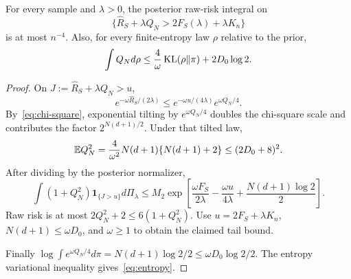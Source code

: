 \begin{lemma}
\label{lem:tail}
For every sample and $\lambda>0$, the posterior raw-risk integral on
\[
 \{\widehat R_S+\lambda Q_N>2F_S(\lambda)+\lambda K_n\}
\]
is at most $n^{-4}$. Also, for every finite-entropy law $\rho$ relative to the prior,
\begin{equation}
 \int Q_Nd\rho\le\frac4\omega\operatorname{KL}(\rho\|\pi)+2D_0\log2.
 \label{eq:entropy}
\end{equation}
\end{lemma}
\begin{proof}
On $J:=\widehat R_S+\lambda Q_N>u$,
\[
 e^{-\omega\widehat R_S/(2\lambda)}
 \le e^{-\omega u/(4\lambda)}e^{\omega Q_N/4}.
\]
By~\eqref{eq:chi-square}, exponential tilting by $e^{\omega Q_N/4}$ doubles the chi-square scale and contributes the factor $2^{N(d+1)/2}$. Under that tilted law,
\[
 \mathbb E Q_N^2=\frac4{\omega^2}N(d+1)\{N(d+1)+2\}\le(2D_0+8)^2.
\]
After dividing by the posterior normalizer,
\[
 \int(1+Q_N^2)\mathbf1_{\{J>u\}}d\Pi_\lambda
 \le M_2\exp\left[\frac{\omega F_S}{2\lambda}-\frac{\omega u}{4\lambda}
                       +\frac{N(d+1)\log2}{2}\right].
\]
Raw risk is at most $2Q_N^2+2\le6(1+Q_N^2)$. Use $u=2F_S+\lambda K_n$, $N(d+1)\le\omega D_0$, and $\omega\ge1$ to obtain the claimed tail bound.

Finally $\log\int e^{\omega Q_N/4}d\pi=N(d+1)\log2/2\le\omega D_0\log2/2$. The entropy variational inequality gives~\eqref{eq:entropy}.
\end{proof}

